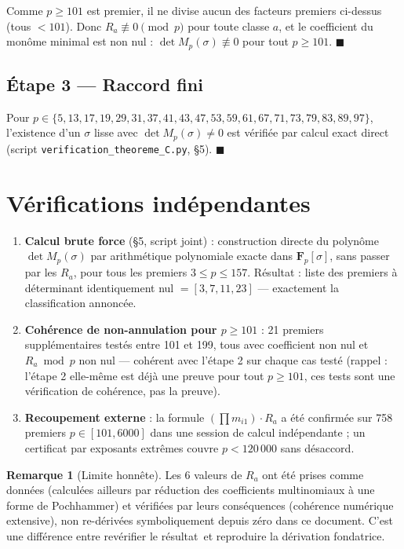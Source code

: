 \documentclass[12pt,a4paper]{article}
\theoremstyle{definition}
\newtheorem{remark}[theorem]{Remarque}
\begin{document}
Comme $p\ge101$ est premier, il ne divise aucun des facteurs premiers ci-dessus (tous $<101$). Donc $R_a\not\equiv0\pmod p$ pour toute classe $a$, et le coefficient du monôme minimal est non nul : $\det M_p(\sigma)\not\equiv0$ pour tout $p\ge101$. $\blacksquare$

\subsection{Étape 3 — Raccord fini}

Pour $p\in\{5,13,17,19,29,31,37,41,43,47,53,59,61,67,71,73,79,83,89,97\}$, l'existence d'un $\sigma$ lisse avec $\det M_p(\sigma)\ne0$ est vérifiée par calcul exact direct (script \texttt{verification\_theoreme\_C.py}, §5). $\blacksquare$

\section{Vérifications indépendantes}

\begin{enumerate}
\item \textbf{Calcul brute force} (§5, script joint) : construction directe du polynôme $\det M_p(\sigma)$ par arithmétique polynomiale exacte dans $\mathbf F_p[\sigma]$, sans passer par les $R_a$, pour tous les premiers $3\le p\le157$. Résultat : liste des premiers à déterminant identiquement nul $=[3,7,11,23]$ — exactement la classification annoncée.
\item \textbf{Cohérence de non-annulation pour $p\ge101$} : 21 premiers supplémentaires testés entre 101 et 199, tous avec coefficient non nul et $R_a\bmod p$ non nul — cohérent avec l'étape 2 sur chaque cas testé (rappel : l'étape 2 elle-même est déjà une preuve pour tout $p\ge101$, ces tests sont une vérification de cohérence, pas la preuve).
\item \textbf{Recoupement externe} : la formule $(\prod m_{i1})\cdot R_a$ a été confirmée sur 758 premiers $p\in[101,6000]$ dans une session de calcul indépendante ; un certificat par exposants extrêmes couvre $p<120\,000$ sans désaccord.
\end{enumerate}

\begin{remark}[Limite honnête]
Les 6 valeurs de $R_a$ ont été prises comme données (calculées ailleurs par réduction des coefficients multinomiaux à une forme de Pochhammer) et vérifiées par leurs conséquences (cohérence numérique extensive), non re-dérivées symboliquement depuis zéro dans ce document. C'est une différence entre \og revérifier le résultat\fg\ et \og reproduire la dérivation fondatrice\fg.
\end{remark}
\end{document}
